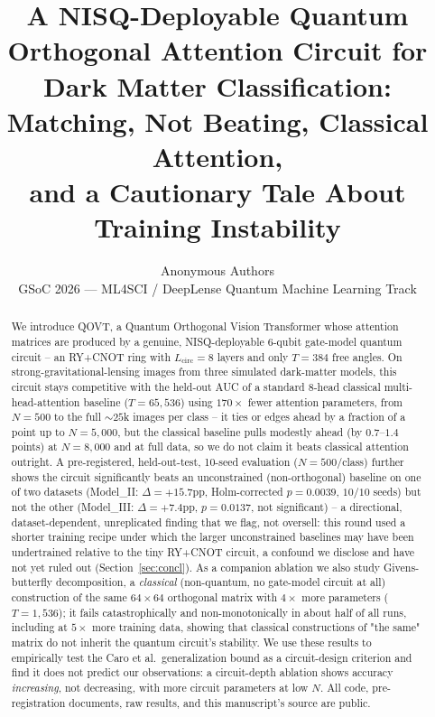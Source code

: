 \documentclass[10pt,letterpaper]{article}
\title{\textbf{A NISQ-Deployable Quantum Orthogonal Attention Circuit for\\
Dark Matter Classification: Matching, Not Beating, Classical Attention,\\
and a Cautionary Tale About Training Instability}}
\author{%
  Anonymous Authors\\[2pt]
  GSoC 2026 --- ML4SCI / DeepLense Quantum Machine Learning Track
}
\date{}
\theoremstyle{plain}
\theoremstyle{definition}
\begin{document}
\maketitle

\begin{abstract}
We introduce QOVT, a Quantum Orthogonal Vision Transformer whose attention
matrices are produced by a genuine, NISQ-deployable 6-qubit gate-model
quantum circuit -- an RY+CNOT ring with $L_\mathrm{circ}{=}8$ layers and
only $T{=}384$ free angles. On strong-gravitational-lensing images from
three simulated dark-matter models, this circuit stays competitive with
the held-out AUC of a standard 8-head classical multi-head-attention
baseline ($T{=}65{,}536$) using $170\times$ fewer attention parameters,
from $N{=}500$ to the full $\sim\!25$k images per class -- it ties or
edges ahead by a fraction of a point up to $N{=}5{,}000$, but the
classical baseline pulls modestly ahead (by $0.7$--$1.4$ points) at
$N{=}8{,}000$ and at full data, so we do not claim it beats classical
attention outright. A
pre-registered, held-out-test, 10-seed evaluation ($N{=}500$/class) further
shows the circuit significantly beats an unconstrained (non-orthogonal)
baseline on one of two datasets (Model\_II: $\Delta{=}{+}15.7$pp,
Holm-corrected $p{=}0.0039$, $10/10$ seeds) but not the other
(Model\_III: $\Delta{=}{+}7.4$pp, $p{=}0.0137$, not significant) -- a
directional, dataset-dependent, unreplicated finding that we flag, not
oversell: this round used a shorter training recipe under which the
larger unconstrained baselines may have been undertrained relative to the
tiny RY+CNOT circuit, a confound we disclose and have not yet ruled out
(Section~\ref{sec:concl}). As a companion ablation we also study Givens-butterfly
decomposition, a \emph{classical} (non-quantum, no gate-model circuit at
all) construction of the same $64{\times}64$ orthogonal matrix with
$4\times$ more parameters ($T{=}1{,}536$); it fails catastrophically and
non-monotonically in about half of all runs, including at $5\times$ more
training data, showing that classical constructions of "the same" matrix
do not inherit the quantum circuit's stability. We use these results to
empirically test the Caro et al.\ generalization bound as a circuit-design
criterion and find it does not predict our observations: a circuit-depth
ablation shows accuracy \emph{increasing}, not decreasing, with more
circuit parameters at low $N$. All code, pre-registration documents, raw
results, and this manuscript's source are public.
\end{abstract}
\end{document}
